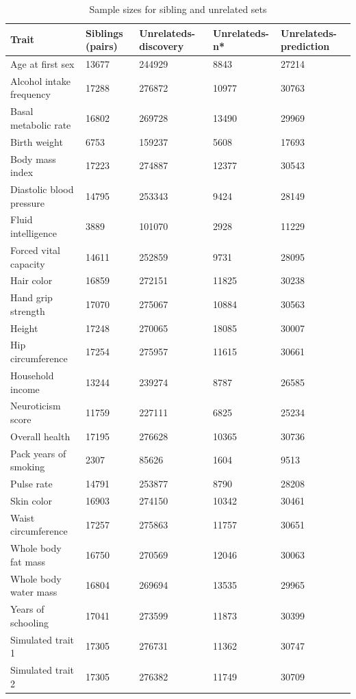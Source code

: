 \documentclass[hidelinks, 12pt]{article}
\begin{document}
\begin{table}[h!]
\caption{Sample sizes for sibling and unrelated sets}
\begin{center}
\small
 \begin{tabular}{| l l l l l |} 
 \hline
 \textbf{Trait} & \textbf{Siblings (pairs)} & \textbf{Unrelateds-discovery} & \textbf{Unrelateds-n*} & \textbf{Unrelateds-prediction}\\ [0.5ex] 
 \hline\hline
  Age at first sex & 13677 & 244929 & 8843 & 27214 \\
Alcohol intake frequency & 17288 & 276872 & 10977 & 30763 \\
Basal metabolic rate & 16802 & 269728 & 13490 & 29969 \\
Birth weight & 6753 & 159237 & 5608 & 17693 \\
Body mass index & 17223 & 274887 & 12377 & 30543 \\
Diastolic blood pressure & 14795 & 253343 & 9424 & 28149 \\
Fluid intelligence & 3889 & 101070 & 2928 & 11229 \\
Forced vital capacity & 14611 & 252859 & 9731 & 28095 \\
Hair color & 16859 & 272151 & 11825 & 30238 \\
Hand grip strength & 17070 & 275067 & 10884 & 30563 \\
Height & 17248 & 270065 & 18085 & 30007 \\
Hip circumference & 17254 & 275957 & 11615 & 30661 \\
Household income & 13244 & 239274 & 8787 & 26585 \\
Neuroticism score & 11759 & 227111 & 6825 & 25234 \\
Overall health & 17195 & 276628 & 10365 & 30736 \\
Pack years of smoking & 2307 & 85626 & 1604 & 9513 \\
Pulse rate & 14791 & 253877 & 8790 & 28208 \\
Skin color & 16903 & 274150 & 10342 & 30461 \\
Waist circumference & 17257 & 275863 & 11757 & 30651 \\
Whole body fat mass & 16750 & 270569 & 12046 & 30063 \\
Whole body water mass & 16804 & 269694 & 13535 & 29965 \\
Years of schooling & 17041 & 273599 & 11873 & 30399 \\
   \hline\hline
Simulated trait 1 & 17305 & 276731 & 11362 & 30747 \\
Simulated trait 2 & 17305 & 276382 & 11749 & 30709 \\
   \hline
 \end{tabular}
\end{center}
\end{table}
\end{document}

